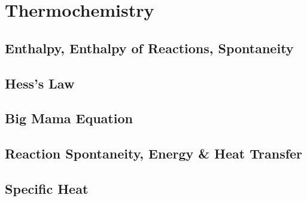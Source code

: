 \documentclass[../hchem.tex]{subfiles}
\begin{document}
\chapter{Thermochemistry}
\section{Enthalpy, Enthalpy of Reactions, Spontaneity}
\section{Hess's Law}
\section{Big Mama Equation}
\section{Reaction Spontaneity, Energy \& Heat Transfer}
\section{Specific Heat}
\end{document}
